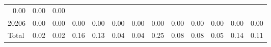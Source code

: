 \begin{table}[!h]
\begin{tabular}{lllllllllllll}
  \multicolumn{1}{r}{0.00} &
  \multicolumn{1}{r}{0.00} &
  \multicolumn{1}{r}{0.00} \\
\multicolumn{1}{l}{\hspace{1em}20206} &
  \multicolumn{1}{|r}{0.00} &
  \multicolumn{1}{r}{0.00} &
  \multicolumn{1}{r}{0.00} &
  \multicolumn{1}{r}{0.00} &
  \multicolumn{1}{r}{0.00} &
  \multicolumn{1}{r}{0.00} &
  \multicolumn{1}{r}{0.00} &
  \multicolumn{1}{r}{0.00} &
  \multicolumn{1}{r}{0.00} &
  \multicolumn{1}{r}{0.00} &
  \multicolumn{1}{r}{0.00} &
  \multicolumn{1}{r}{0.00} \\
\multicolumn{1}{l}{\hspace{1em}Total} &
  \multicolumn{1}{|r}{0.02} &
  \multicolumn{1}{r}{0.02} &
  \multicolumn{1}{r}{0.16} &
  \multicolumn{1}{r}{0.13} &
  \multicolumn{1}{r}{0.04} &
  \multicolumn{1}{r}{0.04} &
  \multicolumn{1}{r}{0.25} &
  \multicolumn{1}{r}{0.08} &
  \multicolumn{1}{r}{0.08} &
  \multicolumn{1}{r}{0.05} &
  \multicolumn{1}{r}{0.14} &
  \multicolumn{1}{r}{0.11} \\
\cline{1-13}
\end{tabular}
\end{table}
